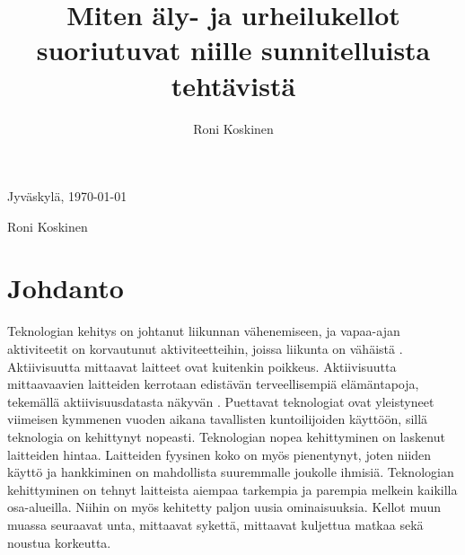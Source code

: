 \documentclass[utf8,bachelor,finnish]{bachelor}
\begin{document}
\title{Miten äly- ja urheilukellot suoriutuvat niille sunnitelluista tehtävistä}

\author{Roni Koskinen}


\maketitle


Jyväskylä, \today

\bigskip

Roni Koskinen


\mainmatter


\chapter{Johdanto}
  Teknologian kehitys on johtanut liikunnan vähenemiseen, ja vapaa-ajan aktiviteetit on korvautunut aktiviteetteihin, joissa liikunta on vähäistä \parencite{petrusevski_interventions_2021}.
   Aktiivisuutta mittaavat laitteet ovat kuitenkin poikkeus. Aktiivisuutta mittaavaavien laitteiden kerrotaan edistävän terveellisempiä elämäntapoja,
    tekemällä aktiivisuusdatasta näkyvän \parencite{shin2015understanding}.
     Puettavat teknologiat ovat yleistyneet viimeisen kymmenen vuoden aikana tavallisten kuntoilijoiden käyttöön, sillä teknologia on kehittynyt nopeasti.
      Teknologian nopea kehittyminen on laskenut laitteiden hintaa. Laitteiden fyysinen koko on myös pienentynyt, joten niiden käyttö ja hankkiminen on mahdollista suuremmalle joukolle ihmisiä.
       Teknologian kehittyminen on tehnyt laitteista aiempaa tarkempia ja parempia melkein kaikilla osa-alueilla. Niihin on myös kehitetty paljon uusia ominaisuuksia.
        Kellot muun muassa seuraavat unta, mittaavat sykettä, mittaavat kuljettua matkaa sekä noustua korkeutta.\\
\end{document}
